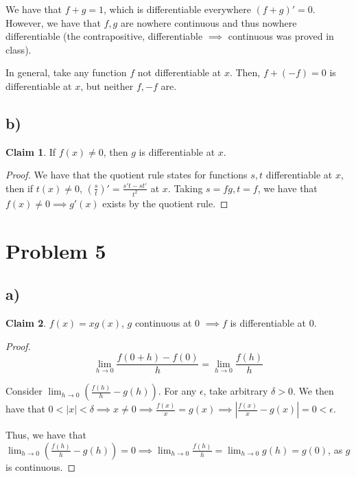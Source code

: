 \documentclass[12pt,letterpaper]{article}
\theoremstyle{definition}
\newtheorem*{claim}{Claim}
\begin{document}
We have that $f + g = 1$, which is differentiable everywhere $(f + g)' = 0$.
However, we have that $f,g$ are nowhere continuous and thus nowhere
differentiable (the contrapositive, differentiable $\implies$ continuous was
proved in class).

In general, take any function $f$ not differentiable at $x$. Then, $f + (-f) =
0$ is differentiable at $x$, but neither $f, -f$ are.

\subsection*{b)}

\begin{claim}
  If $f(x) \neq 0$, then $g$ is differentiable at $x$.
\end{claim}

\begin{proof}
  We have that the quotient rule states for functions $s,t$ differentiable at
  $x$, then if $t(x) \neq 0$, $(\frac{s}{t})' = \frac{s't - st'}{t^2}$ at $x$.
  Taking $s = fg, t = f$, we have that $f(x) \neq 0 \implies g'(x)$ exists by
  the quotient rule.
\end{proof}

\section*{Problem 5}

\subsection*{a)}

\begin{claim}
  $f(x) = xg(x)$, $g$ continuous at 0 $\implies f$ is differentiable at $0$.
\end{claim}

\begin{proof}
  \[
    \lim_{h\rightarrow 0}\frac{f(0 + h) - f(0)}{h} = \lim_{h\rightarrow 0}\frac{f(h)}{h} 
  \]

  Consider $\lim_{h\rightarrow 0}(\frac{f(h)}{h} - g(h))$. For any $\epsilon$,
  take arbitrary $\delta > 0$. We then have that $0 < |x| < \delta \implies x
  \neq 0 \implies \frac{f(x)}{x} = g(x) \implies |\frac{f(x)}{x} - g(x)| = 0 < \epsilon$.

  Thus, we have that $\lim_{h\rightarrow 0} (\frac{f(h)}{h} - g(h)) = 0 \implies
  \lim_{h\rightarrow 0} \frac{f(h)}{h} = \lim_{h\rightarrow 0} g(h) = g(0)$, as
  $g$ is continuous.
\end{proof}
\end{document}
